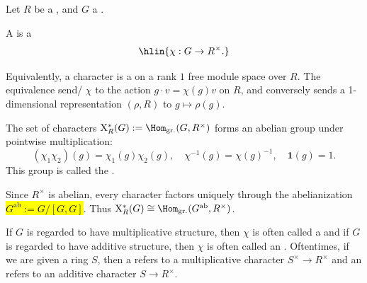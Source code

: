 \begin{definition} \label{definition:character_of_a_group_valued_in_a_ring}
    Let $R$ be a , and $G$ a .

    A  is a 
    $$\hlin{\chi : G \to R^\times.}$$

    Equivalently, a character is a  on a rank $1$ free module space over $R$. The equivalence send/ $\chi$ to the action $g \cdot v = \chi(g)v$ on $R$, and conversely sends a 1-dimensional representation $(\rho, R)$ to $g \mapsto \rho(g)$.

    The set of characters $\mathrm{X}^*_R(G) := \Hom_{\mathrm{gr.}}(G, R^\times)$ forms an abelian group under pointwise multiplication:
    $$ (\chi_1 \chi_2)(g) = \chi_1(g)\chi_2(g), \quad \chi^{-1}(g) = \chi(g)^{-1}, \quad \mathbf{1}(g) = 1. $$
    This group is called the .

    Since $R^\times$ is abelian, every character factors uniquely through the abelianization \hl{$G^{\mathrm{ab}} := G/[G,G]$}. Thus $\mathrm{X}^*_R(G) \cong \Hom_{\mathrm{gr.}}(G^{\mathrm{ab}}, R^\times)$.

    If $G$ is regarded to have multiplicative structure, then $\chi$ is often called a  and if $G$ is regarded to have additive structure, then $\chi$ is often called an . Oftentimes, if we are given a ring $S$, then a  refers to a multiplicative character $S^\times \to R^\times$ and an  refers to an additive character $S \to R^\times$.
\end{definition}
